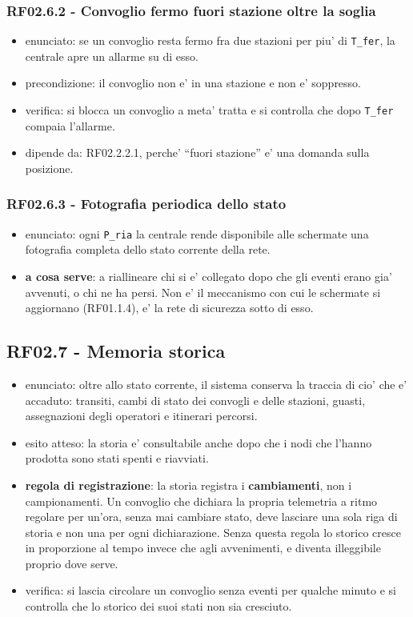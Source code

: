 \documentclass[11pt]{article}
\begin{document}
\subsubsection{RF02.6.2 - Convoglio fermo fuori stazione oltre la soglia}
\label{sec:org00a1358}
\begin{itemize}
\item enunciato: se un convoglio resta fermo fra due stazioni per piu' di \texttt{T\_fer}, la centrale apre un
allarme su di esso.
\item precondizione: il convoglio non e' in una stazione e non e' soppresso.
\item verifica: si blocca un convoglio a meta' tratta e si controlla che dopo \texttt{T\_fer} compaia l'allarme.
\item dipende da: RF02.2.2.1, perche' ``fuori stazione'' e' una domanda sulla posizione.
\end{itemize}
\subsubsection{RF02.6.3 - Fotografia periodica dello stato}
\label{sec:org36cff32}
\begin{itemize}
\item enunciato: ogni \texttt{P\_ria} la centrale rende disponibile alle schermate una fotografia completa dello
stato corrente della rete.
\item \textbf{a cosa serve}: a riallineare chi si e' collegato dopo che gli eventi erano gia' avvenuti, o chi ne
ha persi. Non e' il meccanismo con cui le schermate si aggiornano (RF01.1.4), e' la rete di
sicurezza sotto di esso.
\end{itemize}
\subsection{RF02.7 - Memoria storica}
\label{sec:orgae3cf8a}

\begin{itemize}
\item enunciato: oltre allo stato corrente, il sistema conserva la traccia di cio' che e' accaduto:
transiti, cambi di stato dei convogli e delle stazioni, guasti, assegnazioni degli operatori e
itinerari percorsi.
\item esito atteso: la storia e' consultabile anche dopo che i nodi che l'hanno prodotta sono stati
spenti e riavviati.
\item \textbf{regola di registrazione}: la storia registra i \textbf{cambiamenti}, non i campionamenti. Un convoglio
che dichiara la propria telemetria a ritmo regolare per un'ora, senza mai cambiare stato, deve
lasciare una sola riga di storia e non una per ogni dichiarazione. Senza questa regola lo storico
cresce in proporzione al tempo invece che agli avvenimenti, e diventa illeggibile proprio dove
serve.
\item verifica: si lascia circolare un convoglio senza eventi per qualche minuto e si controlla che lo
storico dei suoi stati non sia cresciuto.
\end{itemize}
\end{document}

